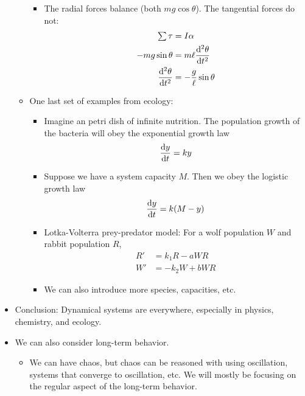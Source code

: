 \documentclass[../notes.tex]{subfiles}
\begin{document}
\begin{itemize}
\begin{itemize}
\begin{itemize}
            \item The radial forces balance (both $mg\cos\theta$). The tangential forces do not:
            \begin{align*}
                \textstyle\sum\tau &= I\alpha\\
                -mg\sin\theta &= m\ell\dv[2]{\theta}{t}\\
                \dv[2]{\theta}{t} &= -\frac{g}{\ell}\sin\theta
            \end{align*}
        \end{itemize}
        \item One last set of examples from ecology:
        \begin{itemize}
            \item Imagine an petri dish of infinite nutrition. The population growth of the bacteria will obey the exponential growth law
            \begin{equation*}
                \dv{y}{t} = ky
            \end{equation*}
            \item Suppose we have a system capacity $M$. Then we obey the logistic growth law
            \begin{equation*}
                \dv{y}{t} = k(M-y)
            \end{equation*}
            \item Lotka-Volterra prey-predator model: For a wolf population $W$ and rabbit population $R$,
            \begin{align*}
                R' &= k_1R-aWR\\
                W' &= -k_2W+bWR
            \end{align*}
            \item We can also introduce more species, capacities, etc.
        \end{itemize}
    \end{itemize}
    \item Conclusion: Dynamical systems are everywhere, especially in physics, chemistry, and ecology.
    \item We can also consider long-term behavior.
    \begin{itemize}
        \item We can have chaos, but chaos can be reasoned with using oscillation, systems that converge to oscillation, etc. We will mostly be focusing on the regular aspect of the long-term behavior.
    \end{itemize}
\end{itemize}
\end{document}
